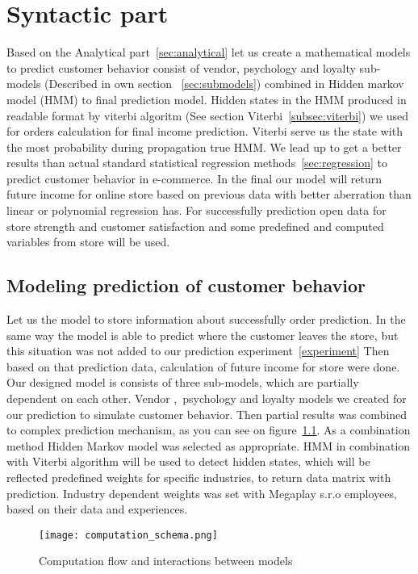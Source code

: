 
\chapter{Syntactic part} \label{sec:methodology}
Based on the Analytical part~\ref{sec:analytical} let us create a mathematical models to predict customer behavior consist of
vendor, psychology and loyalty sub-models (Described in own section ~\ref{sec:submodels}) combined in Hidden markov model (HMM) to final prediction model.
Hidden states in the HMM produced in readable format by viterbi algoritm (See section Viterbi~\ref{subsec:viterbi}) we used for orders calculation for final income prediction.
Viterbi serve us the state with the most probability during propagation true HMM.
We lead up to get a better results than actual standard statistical regression methods~\ref{sec:regression} to predict customer behavior in e-commerce.
In the final our model will return future income for online store based on previous data with better aberration than linear or polynomial regression has.
For successfully prediction open data for store strength and customer satisfaction and some predefined and computed variables from store will be used.
\section{Modeling prediction of customer behavior} \label{sec:modeling}
Let us the model to store information about successfully order prediction.
In the same way the model is able to predict where the customer leaves the store, but this situation was not added to our prediction experiment~\ref{experiment}
Then based on that prediction data, calculation of future income for store were done.
Our designed model is consists of three sub-models, which are partially dependent on each other.
Vendor ,\ psychology and loyalty models we created for our prediction to simulate customer behavior.
Then partial results was combined to complex prediction mechanism, as you can see on figure~\ref{Model schema with interaction}.
As a combination method Hidden Markov model was selected as appropriate.
HMM in combination with Viterbi algorithm will be used to detect hidden states, which will be reflected predefined weights for specific industries,
to return data matrix with prediction.
Industry dependent weights was set with Megaplay s.r.o employees, based on their data and experiences.
\\
\begin{figure}[h!]
    \begin{center}
        \texttt{[image: computation\_schema.png]}
    \end{center}
    \caption{Computation flow and interactions between models}
    \label{Model schema with interaction}
\end{figure}
\\

